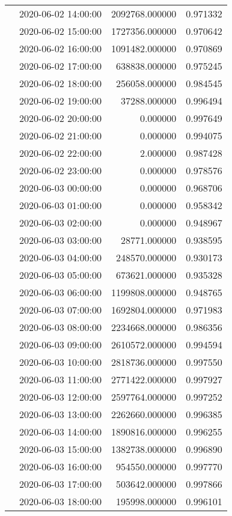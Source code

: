 \begin{tabular}{llrr}
 & 2020-06-02 14:00:00 & 2092768.000000 & 0.971332 \\
 & 2020-06-02 15:00:00 & 1727356.000000 & 0.970642 \\
 & 2020-06-02 16:00:00 & 1091482.000000 & 0.970869 \\
 & 2020-06-02 17:00:00 & 638838.000000 & 0.975245 \\
 & 2020-06-02 18:00:00 & 256058.000000 & 0.984545 \\
 & 2020-06-02 19:00:00 & 37288.000000 & 0.996494 \\
 & 2020-06-02 20:00:00 & 0.000000 & 0.997649 \\
 & 2020-06-02 21:00:00 & 0.000000 & 0.994075 \\
 & 2020-06-02 22:00:00 & 2.000000 & 0.987428 \\
 & 2020-06-02 23:00:00 & 0.000000 & 0.978576 \\
 & 2020-06-03 00:00:00 & 0.000000 & 0.968706 \\
 & 2020-06-03 01:00:00 & 0.000000 & 0.958342 \\
 & 2020-06-03 02:00:00 & 0.000000 & 0.948967 \\
 & 2020-06-03 03:00:00 & 28771.000000 & 0.938595 \\
 & 2020-06-03 04:00:00 & 248570.000000 & 0.930173 \\
 & 2020-06-03 05:00:00 & 673621.000000 & 0.935328 \\
 & 2020-06-03 06:00:00 & 1199808.000000 & 0.948765 \\
 & 2020-06-03 07:00:00 & 1692804.000000 & 0.971983 \\
 & 2020-06-03 08:00:00 & 2234668.000000 & 0.986356 \\
 & 2020-06-03 09:00:00 & 2610572.000000 & 0.994594 \\
 & 2020-06-03 10:00:00 & 2818736.000000 & 0.997550 \\
 & 2020-06-03 11:00:00 & 2771422.000000 & 0.997927 \\
 & 2020-06-03 12:00:00 & 2597764.000000 & 0.997252 \\
 & 2020-06-03 13:00:00 & 2262660.000000 & 0.996385 \\
 & 2020-06-03 14:00:00 & 1890816.000000 & 0.996255 \\
 & 2020-06-03 15:00:00 & 1382738.000000 & 0.996890 \\
 & 2020-06-03 16:00:00 & 954550.000000 & 0.997770 \\
 & 2020-06-03 17:00:00 & 503642.000000 & 0.997866 \\
 & 2020-06-03 18:00:00 & 195998.000000 & 0.996101 \\

\end{tabular}
